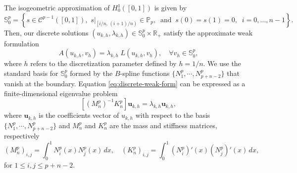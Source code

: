 \documentclass[11pt]{article}
\begin{document}
The isogeometric approximation of $H^1_0([0,1])$ is given by 
\begin{equation}\label{eq:Schoenberg-Dirichlet-space}
\mathbb{S}^{p}_0 = \left\{ s \in \mathcal{C}^{p-1}([0,1]),\,\,s|_{\left[ i/n, \, (i+1)/n \right)} \in \mathbb{P}_{p},\;\;\text{and}\;\;s(0)=s(1)=0,\;\; i=0,\dots,n-1 \right\}.
\end{equation} 
Then, our discrete solutions  $(u_{k,h}, \lambda_{k,h}) \in \mathbb{S}^{p}_0 \times \mathbb{R}_+$ satisfy the approximate weak formulation
\begin{equation}\label{eq:discrete-weak-form}
A(u_{k,h},v_h)=\lambda_{k,h} \;L(u_{k,h},v_h),\quad \forall v_h \in \mathbb{S}^{p}_0,
\end{equation}
where $h$ refers to the discretization parameter defined by $h=1/n$. We use the standard basis for $\mathbb{S}^{p}_0$ formed by the $B$-spline functions $\{N_{1}^p, \cdots, N_{p+n-2}^p\}$ that vanish at the boundary. 
Equation \eqref{eq:discrete-weak-form} can be expressed as a finite-dimensional eigenvalue problem
\begin{equation*}
\left[\left( M_n^p\right)^{-1} K_n^p \right] \mathbf{u}_{k,h} = \lambda_{k,h} \mathbf{u}_{k,h},
\end{equation*}
where $\mathbf{u}_{k,h}$ is the coefficients vector of $u_{k,h}$ with respect to the  basis $\{N_{1}^p, \cdots, N_{p+n-2}^p\}$ and $M_n^p$ and $K_n^p$ are the mass and stiffness matrices, respectively 
\begin{equation*}
(M_n^p)_{i,j}= \int_0^1 N_i^p(x) N_j^p(x) \, dx,\quad(K_n^p)_{i,j} = \int_0^1 (N_i^p)'(x) (N_j^p)'(x) \, dx,
\end{equation*} 
for  $1 \leq i,j \leq p+n-2.$
\end{document}
